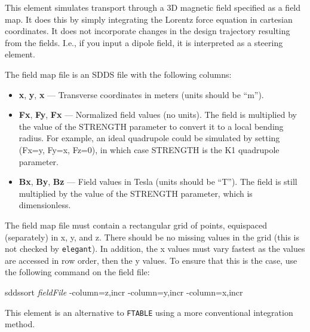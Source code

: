 This element simulates transport through a 3D magnetic field
specified as a field map.  It does this by simply integrating the
Lorentz force equation in cartesian coordinates.  It does not
incorporate changes in the design trajectory resulting from the
fields.  I.e., if you input a dipole field, it is interpreted as a
steering element.

The field map file is an SDDS file with the following columns:
\begin{itemize}
\item {\bf x}, {\bf y}, {\bf x} --- Transverse coordinates in meters (units should be ``m'').
\item {\bf Fx}, {\bf Fy}, {\bf Fx} --- Normalized field values (no units).  The
        field is multiplied by the value of the STRENGTH parameter to convert it to a 
        local bending radius.  For example, an ideal quadrupole could be simulated
        by setting (Fx=y, Fy=x, Fz=0), in which case STRENGTH is the
        K1 quadrupole parameter.
\item {\bf Bx}, {\bf By}, {\bf Bz} --- Field values in Tesla (units should be ``T'').
        The field is still multiplied by the value of the STRENGTH parameter, which
        is dimensionless.
\end{itemize}

The field map file must contain a rectangular grid of points,
equispaced (separately) in x, y, and z.  There should be no missing values
in the grid (this is not checked by {\tt elegant}).  In addition, the
x values must vary fastest as the values are accessed in row order, then the y values.
To ensure that this is the case, use the following command on the field
file:
\begin{flushleft}
sddssort {\em fieldFile} -column=z,incr -column=y,incr -column=x,incr
\end{flushleft}

This element is an alternative to \verb|FTABLE| using a more conventional integration method.
